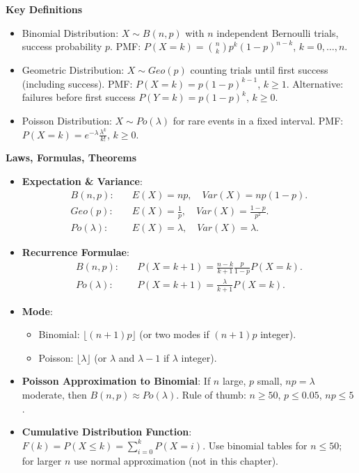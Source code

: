 \documentclass[11pt]{article}
\newcommand{\cle}[1]{{\popxbold\color{popdark}#1}}
\begin{document}
\begin{bilan}
\textbf{Key Definitions}
\begin{itemize}
\item \cle{Binomial Distribution}: $X\sim B(n,p)$ with $n$ independent Bernoulli trials, success probability $p$. PMF: $P(X=k)=\binom{n}{k}p^k(1-p)^{n-k}$, $k=0,\dots,n$.
\item \cle{Geometric Distribution}: $X\sim Geo(p)$ counting trials until first success (including success). PMF: $P(X=k)=p(1-p)^{k-1}$, $k\ge1$. Alternative: failures before first success $P(Y=k)=p(1-p)^k$, $k\ge0$.
\item \cle{Poisson Distribution}: $X\sim Po(\lambda)$ for rare events in a fixed interval. PMF: $P(X=k)=e^{-\lambda}\frac{\lambda^k}{k!}$, $k\ge0$.
\end{itemize}

\textbf{Laws, Formulas, Theorems}
\begin{itemize}
\item \textbf{Expectation \& Variance}:
  \begin{align*}
  B(n,p):&\quad E(X)=np,\quad Var(X)=np(1-p).\\
  Geo(p):&\quad E(X)=\frac1p,\quad Var(X)=\frac{1-p}{p^2}.\\
  Po(\lambda):&\quad E(X)=\lambda,\quad Var(X)=\lambda.
  \end{align*}
\item \textbf{Recurrence Formulae}:
  \begin{align*}
  B(n,p):&\quad P(X=k+1)=\frac{n-k}{k+1}\frac{p}{1-p}P(X=k).\\
  Po(\lambda):&\quad P(X=k+1)=\frac{\lambda}{k+1}P(X=k).
  \end{align*}
\item \textbf{Mode}:
  \begin{itemize}
  \item Binomial: $\lfloor (n+1)p\rfloor$ (or two modes if $(n+1)p$ integer).
  \item Poisson: $\lfloor\lambda\rfloor$ (or $\lambda$ and $\lambda-1$ if $\lambda$ integer).
  \end{itemize}
\item \textbf{Poisson Approximation to Binomial}: If $n$ large, $p$ small, $np=\lambda$ moderate, then $B(n,p)\approx Po(\lambda)$. Rule of thumb: $n\ge50$, $p\le0.05$, $np\le5$.
\item \textbf{Cumulative Distribution Function}: $F(k)=P(X\le k)=\sum_{i=0}^k P(X=i)$. Use binomial tables for $n\le50$; for larger $n$ use normal approximation (not in this chapter).
\end{itemize}


\end{bilan}
\end{document}
